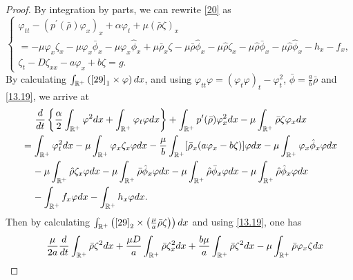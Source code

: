 \documentclass[10pt,a4paper]{amsart}
\begin{document}
	\begin{proof}
		By integration by parts, we can rewrite \eqref{20} as 
		\begin{equation}\label{29}
			\left\{
			\begin{array}{lr}
				\varphi_{tt}-(p^{\prime}(\bar\rho)\varphi_x)_x+\alpha \varphi_t+\mu(\bar\rho\zeta)_x\\[2mm]
				=-\mu \varphi_x\zeta_x-\mu \varphi_x\bar\phi_x-\mu \varphi_x\hat\phi_x+\mu\bar\rho_x\zeta-\mu\bar\rho\hat\phi_x-\mu\hat\rho\zeta_x-\mu\hat\rho\bar\phi_x-\mu\hat\rho\hat\phi_x-h_x-f_x,\\[2mm]
				\zeta_t-D\zeta_{xx}-a\varphi_x+b\zeta=g.
			\end{array}
			\right.
		\end{equation}
		By calculating $\int_{\mathbb{R}^+}\left(\eqref{29}_1\times\varphi\right){\rm d}x$, and using $\varphi_{tt}\varphi=(\varphi_t\varphi)_t-\varphi_t^2$, $\bar\phi=\frac{a}{b}\bar\rho$ and \eqref{13.19},  we arrive at
\begin{align}\label{31}
			&\;\;\;\;\;	\frac{{\rm d}}{{\rm d}t}\left\{\frac{\alpha}{2}\int_{\mathbb{R}^+}\varphi^2{\rm d}x+\int_{\mathbb{R}^+}^{}\varphi_t\varphi {\rm d}x\right\}+\int_{\mathbb{R}^+}^{}p^{\prime}(\bar\rho)\varphi_x^2 {\rm d}x-\mu\int_{\mathbb{R}^+}^{}\bar\rho\zeta\varphi_x {\rm d}x\notag\\
			&=\int_{\mathbb{R}^+}\varphi_t^2{\rm d}x-\mu\int_{\mathbb{R}^+}^{}\varphi_x\zeta_x\varphi {\rm d}x-\frac{\mu}{b}\int_{\mathbb{R}^+}^{}[\bar\rho_x(a\varphi_x-b\zeta)]\varphi{\rm d}x-\mu\int_{\mathbb{R}^+}^{}\varphi_x\hat\phi_x\varphi{\rm d}x\notag\\
			&\;\;\;\;-\mu\int_{\mathbb{R}^+}^{}\hat\rho\zeta_x\varphi{\rm d}x	-\mu\int_{\mathbb{R}^+}^{}\bar\rho\hat\phi_x\varphi{\rm d}x-\mu\int_{\mathbb{R}^+}\hat\rho\bar\phi_x\varphi{\rm d}x	-\mu\int_{\mathbb{R}^+}\hat\rho\hat\phi_x\varphi{\rm d}x\notag\\
			&\;\;\;\;
		-\int_{\mathbb{R}^+}^{}f_x\varphi{\rm d}x-\int_{\mathbb{R}^+}h_x\varphi{\rm d}x.
		\end{align}
		Then by calculating $\int_{\mathbb{R}^+}\left(\eqref{29}_2\times\left(\frac{\mu}{a}\bar\rho\zeta\right)\right){\rm d}x$ and using \eqref{13.19}, one has
		\begin{align}\label{32}
			&\;\;\;\;\frac{\mu}{2a}	\frac{{\rm d}}{{\rm d}t}\int_{\mathbb{R}^+}^{}\bar\rho\zeta^2{\rm d}x+\frac{\mu D}{a}\int_{\mathbb{R}^+}^{}\bar\rho\zeta_x^2{\rm d}x+\frac{b\mu}{a}\int_{\mathbb{R}^+}^{}\bar\rho\zeta^2{\rm d}x-\mu\int_{\mathbb{R}^+}^{}\bar\rho\varphi_x\zeta {\rm d}x\notag\\

\end{align}
\end{proof}
\end{document}

